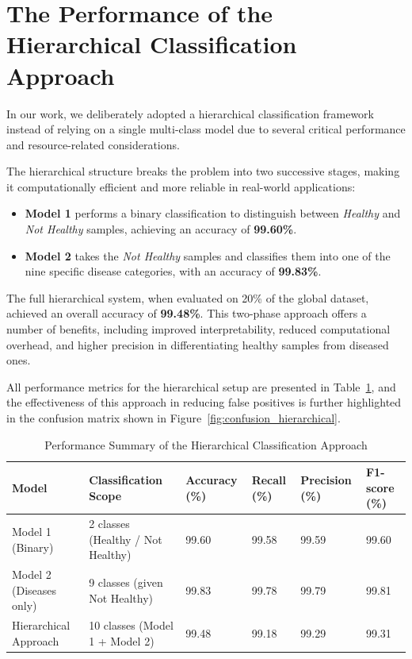 \section{The Performance of the Hierarchical Classification Approach}
\label{sec:justifyHAmodel}

In our work, we deliberately adopted a hierarchical classification framework instead of relying on a single multi-class model due to several critical performance and resource-related considerations.

The hierarchical structure breaks the problem into two successive stages, making it computationally efficient and more reliable in real-world applications:

\begin{itemize}
    \item \textbf{Model 1} performs a binary classification to distinguish between \textit{Healthy} and \textit{Not Healthy} samples, achieving an accuracy of \textbf{99.60\%}.
    \item \textbf{Model 2} takes the \textit{Not Healthy} samples and classifies them into one of the nine specific disease categories, with an accuracy of \textbf{99.83\%}.
\end{itemize}

The full hierarchical system, when evaluated on 20\% of the global dataset, achieved an overall accuracy of \textbf{99.48\%}. This two-phase approach offers a number of benefits, including improved interpretability, reduced computational overhead, and higher precision in differentiating healthy samples from diseased ones.

All performance metrics for the hierarchical setup are presented in Table~\ref{tab:hierarchical}, and the effectiveness of this approach in reducing false positives is further highlighted in the confusion matrix shown in Figure~\ref{fig:confusion_hierarchical}.

\begin{table}[H]
\centering
\renewcommand{\arraystretch}{1.3}
\setlength{\tabcolsep}{6pt}
\caption{Performance Summary of the Hierarchical Classification Approach}
\begin{tabular}{|p{3.5cm}|p{3.7cm}|p{1.9cm}|p{1.9cm}|p{1.9cm}|p{1.9cm}|}
\hline
\textbf{Model} & \textbf{Classification Scope} & \textbf{Accuracy (\%)} & \textbf{Recall (\%)} & \textbf{Precision (\%)} & \textbf{F1-score (\%)} \\
\hline
Model 1 (Binary) & 2 classes (Healthy / Not Healthy) & 99.60 & 99.58 & 99.59 & 99.60 \\
\hline
Model 2 (Diseases only) & 9 classes (given Not Healthy) & 99.83 & 99.78 & 99.79 & 99.81 \\
\hline
Hierarchical Approach & 10 classes (Model 1 + Model 2) & 99.48 & 99.18 & 99.29 & 99.31 \\
\hline
\end{tabular}
\label{tab:hierarchical}
\end{table}

